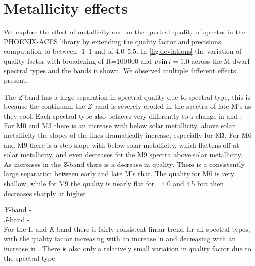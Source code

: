 
%

\section{Metallicity \Logg{} effects}
We explore the effect of metallicity and \Logg{} on the spectral quality of spectra in the {PHOENIX-ACES} library by extending the quality factor and precisions computation to \feh{} between -1--1 and \Logg{} of 4.0--5.5.
In \cref{fig:deviations} the variation of quality factor with broadening of R=100\,000 and $v\sin{i}=1.0$\kmps{} across the {M-dwarf} spectral types and the \nir{} bands is shown.
We observed multiple different effects present.


The \emph{Z}-band has a large separation in spectral quality due to spectral type, this is because the continuum the \emph{Z}-band is severely eroded in the spectra of late M's as they cool.
Each spectral type also behaves very differently to a change in \feh{} and \Logg{}.
For {M0} and {M3} there is an increase with \feh{} below solar metallicity, above solar metallicity the slopes of the lines dramatically increase, especially for {M3}.
For {M6} and {M9} there is a step slope with \feh{} below solar metallicity, which flattens off at solar metallicity, and even decreases for the {M9} spectra above solar metallicity.
As \Logg{} increases in the \emph{Z}-band there is a decrease in quality.
There is a consistently large separation between early and late M's that.
The quality for {M6} is very shallow, while for {M9} the quality is nearly flat for \Logg{}=4.0 and 4.5 but then decreases sharply at higher \Logg{}.

\emph{Y}-band -\\

\emph{J}-band - \\

For the H and \emph{K}-band there is fairly consistent linear trend for all spectral types, with the quality factor increasing with an increase in \feh{} and decreasing with an increase in \Logg{}.
There is also only a relatively small variation in quality factor due to the spectral type.



